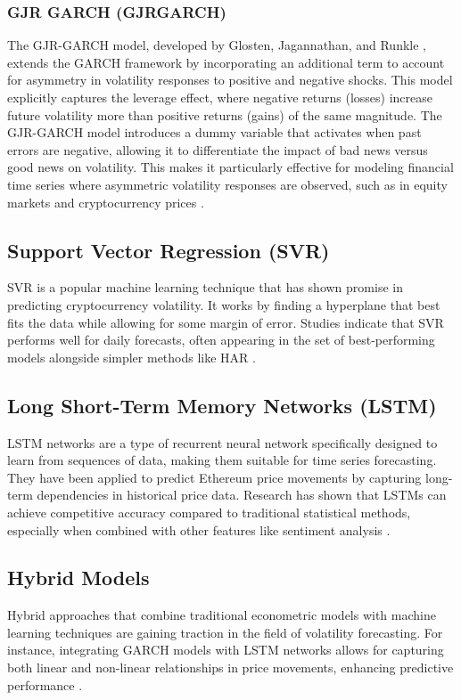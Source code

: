 \documentclass[8pt]{article}
\begin{document}
\begin{multicols}{2}
		\subsubsection{GJR GARCH (GJRGARCH)}
		The GJR-GARCH model, developed by Glosten, Jagannathan, and Runkle \cite{glosten1993}, extends the GARCH framework by incorporating an additional term to account for asymmetry in volatility responses to positive and negative shocks. This model explicitly captures the leverage effect, where negative returns (losses) increase future volatility more than positive returns (gains) of the same magnitude. The GJR-GARCH model introduces a dummy variable that activates when past errors are negative, allowing it to differentiate the impact of bad news versus good news on volatility. This makes it particularly effective for modeling financial time series where asymmetric volatility responses are observed, such as in equity markets and cryptocurrency prices \cite{brooks2014}.

		\subsection{Support Vector Regression (SVR)}
		SVR is a popular machine learning technique that has shown promise in predicting cryptocurrency volatility. It works by finding a hyperplane that best fits the data while allowing for some margin of error. Studies indicate that SVR performs well for daily forecasts, often appearing in the set of best-performing models alongside simpler methods like HAR \cite{cortes1995}.
		
		\subsection{Long Short-Term Memory Networks (LSTM)}
		LSTM networks are a type of recurrent neural network specifically designed to learn from sequences of data, making them suitable for time series forecasting. They have been applied to predict Ethereum price movements by capturing long-term dependencies in historical price data. Research has shown that LSTMs can achieve competitive accuracy compared to traditional statistical methods, especially when combined with other features like sentiment analysis \cite{islam2020}.
		
		\subsection{Hybrid Models}
		Hybrid approaches that combine traditional econometric models with machine learning techniques are gaining traction in the field of volatility forecasting. For instance, integrating GARCH models with LSTM networks allows for capturing both linear and non-linear relationships in price movements, enhancing predictive performance \cite{zoumpekas2020}.
		

\end{multicols}
\end{document}
